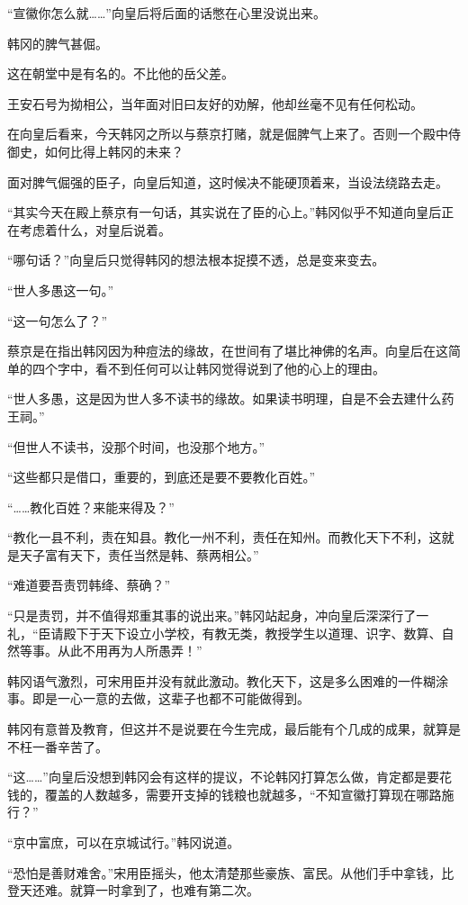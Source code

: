 “宣徽你怎么就……”向皇后将后面的话憋在心里没说出来。

韩冈的脾气甚倔。

这在朝堂中是有名的。不比他的岳父差。

王安石号为拗相公，当年面对旧曰友好的劝解，他却丝毫不见有任何松动。

在向皇后看来，今天韩冈之所以与蔡京打赌，就是倔脾气上来了。否则一个殿中侍御史，如何比得上韩冈的未来？

面对脾气倔强的臣子，向皇后知道，这时候决不能硬顶着来，当设法绕路去走。

“其实今天在殿上蔡京有一句话，其实说在了臣的心上。”韩冈似乎不知道向皇后正在考虑着什么，对皇后说着。

“哪句话？”向皇后只觉得韩冈的想法根本捉摸不透，总是变来变去。

“世人多愚这一句。”

“这一句怎么了？”

蔡京是在指出韩冈因为种痘法的缘故，在世间有了堪比神佛的名声。向皇后在这简单的四个字中，看不到任何可以让韩冈觉得说到了他的心上的理由。

“世人多愚，这是因为世人多不读书的缘故。如果读书明理，自是不会去建什么药王祠。”

“但世人不读书，没那个时间，也没那个地方。”

“这些都只是借口，重要的，到底还是要不要教化百姓。”

“……教化百姓？来能来得及？”

“教化一县不利，责在知县。教化一州不利，责任在知州。而教化天下不利，这就是天子富有天下，责任当然是韩、蔡两相公。”

“难道要吾责罚韩绛、蔡确？”

“只是责罚，并不值得郑重其事的说出来。”韩冈站起身，冲向皇后深深行了一礼，“臣请殿下于天下设立小学校，有教无类，教授学生以道理、识字、数算、自然等事。从此不用再为人所愚弄！”

韩冈语气激烈，可宋用臣并没有就此激动。教化天下，这是多么困难的一件糊涂事。即是一心一意的去做，这辈子也都不可能做得到。

韩冈有意普及教育，但这并不是说要在今生完成，最后能有个几成的成果，就算是不枉一番辛苦了。

“这……”向皇后没想到韩冈会有这样的提议，不论韩冈打算怎么做，肯定都是要花钱的，覆盖的人数越多，需要开支掉的钱粮也就越多，“不知宣徽打算现在哪路施行？”

“京中富庶，可以在京城试行。”韩冈说道。

“恐怕是善财难舍。”宋用臣摇头，他太清楚那些豪族、富民。从他们手中拿钱，比登天还难。就算一时拿到了，也难有第二次。

